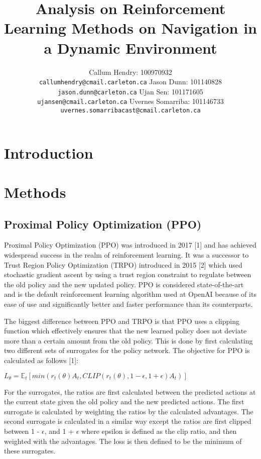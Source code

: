 \documentclass{article}
\title{Analysis on Reinforcement Learning Methods on Navigation in a Dynamic Environment}
\author{
Callum Hendry: 100970932\\
\texttt{callumhendry@cmail.carleton.ca}
\And
Jason Dunn: 101140828\\
\texttt{jason.dunn@carleton.ca}
\And
Ujan Sen: 101171605\\
\texttt{ujansen@cmail.carleton.ca}
\And
Uvernes Somarriba: 101146733\\
\texttt{uvernes.somarribacast@cmail.carleton.ca}
}
\begin{document}
\maketitle

\section{Introduction}


\section{Methods}
\subsection{Proximal Policy Optimization (PPO)}

Proximal Policy Optimization (PPO) was introduced in 2017 [1] and has achieved widespread success in the realm of reinforcement learning. It was a successor to Trust Region Policy Optimization (TRPO) introduced in 2015 [2] which used stochastic gradient ascent by using a trust region constraint to regulate between the old policy and the new updated policy. PPO is considered state-of-the-art and is the default reinforcement learning algorithm used at OpenAI because of its ease of use and significantly better and faster performance than its counterparts. 

The biggest difference between PPO and TRPO is that PPO uses a clipping function which effectively ensures that the new learned policy does not deviate more than a certain amount from the old policy. This is done by first calculating two different sets of surrogates for the policy network. The objective for PPO is calculated as follows [1]:

\begin{center}
$L_{\theta} = \mathbb{E}_{t}[min(r_{t}({\theta})A_{t}, CLIP(r_{t}({\theta}), 1-\epsilon, 1+\epsilon)A_{t})]$
\end{center}

For the surrogates, the ratios are first calculated between the predicted actions at the current state given the old policy and the new predicted actions. The first surrogate is calculated by weighting the ratios by the calculated advantages. The second surrogate is calculated in a similar way except the ratios are first clipped between 1 - $\epsilon$, and 1 + $\epsilon$ where epsilon is defined as the clip ratio, and then weighted with the advantages. The loss is then defined to be the minimum of these surrogates.
\end{document}
